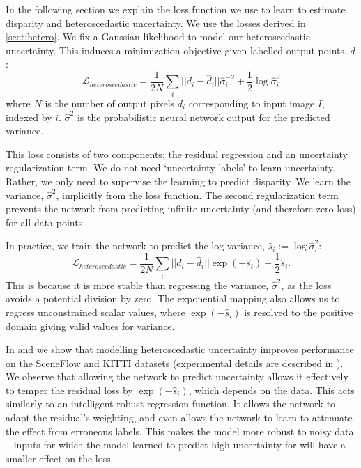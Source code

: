In the following section we explain the loss function we use to learn to estimate disparity and heteroscedastic uncertainty. We use the losses derived in \cref{sect:hetero}. We fix a Gaussian likelihood to model our heteroscedastic uncertainty. This induces a minimization objective given labelled output points, $d$:
\begin{equation}
\mathcal{L}_{heteroscedastic} = \frac{1}{2N} \sum_i ||d_i-\hat{d}_i||\hat{\sigma}^{-2}_i + \frac{1}{2}\log{\hat{\sigma}^2_i}
\label{eqn:bayes_loss}
\end{equation}
where $N$ is the number of output pixels $\hat{d}_i$ corresponding to input image $I$, indexed by $i$. $\hat{\sigma}^2$ is the probabilistic neural network output for the predicted variance.

This loss consists of two components; the residual regression and an uncertainty regularization term. We do not need `uncertainty labels' to learn uncertainty. Rather, we only need to supervise the learning to predict disparity. We learn the variance, $\hat{\sigma}^2$, implicitly from the loss function. The second regularization term prevents the network from predicting infinite uncertainty (and therefore zero loss) for all data points.

In practice, we train the network to predict the log variance, $\hat{s}_i := \log \hat{\sigma}_i^2$: 
\begin{equation}
\mathcal{L}_{heteroscedastic} = \frac{1}{2N} \sum_i ||d_i-\hat{d}_i|| \exp (-\hat{s}_i) + \frac{1}{2}\hat{s}_i.
\label{eqn:aleatoric_regression_loss2}
\end{equation}
This is because it is more stable than regressing the variance, $\hat{\sigma}^2$, as the loss avoids a potential division by zero. The exponential mapping also allows us to regress unconstrained scalar values, where $\exp(-\hat{s}_i)$ is resolved to the positive domain giving valid values for variance.

In  and  we show that modelling heteroscedastic uncertainty improves performance on the SceneFlow and KITTI datasets (experimental details are described in ). We observe that allowing the network to predict uncertainty allows it effectively to temper the residual loss by $\exp(-\hat{s}_i)$, which depends on the data. This acts similarly to an intelligent robust regression function. It allows the network to adapt the residual's weighting, and even allows the network to learn to attenuate the effect from erroneous labels. This makes the model more robust to noisy data -- inputs for which the model learned to predict high uncertainty for will have a smaller effect on the loss.

